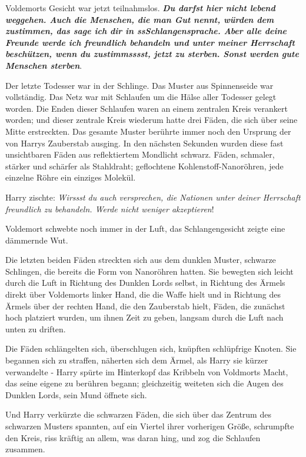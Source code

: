 Voldemorts Gesicht war jetzt teilnahmslos. \glqq{}\textbf{\emph{Du darfst hier
nicht lebend weggehen. Auch die Menschen, die man Gut nennt, würden dem
zustimmen, das sage ich dir in ssSchlangensprache. Aber alle deine Freunde werde
ich freundlich behandeln und unter meiner Herrschaft beschützen, wenn du
zustimmsssst, jetzt zu sterben. Sonst werden gute Menschen sterben}}.\grqq{}

Der letzte Todesser war in der Schlinge. Das Muster aus Spinnenseide war
vollständig. Das Netz war mit Schlaufen um die Hälse aller Todesser gelegt
worden. Die Enden dieser Schlaufen waren an einem zentralen Kreis verankert
worden; und dieser zentrale Kreis wiederum hatte drei Fäden, die sich über seine
Mitte erstreckten. Das gesamte Muster berührte immer noch den Ursprung der von
Harrys Zauberstab ausging. In den nächsten Sekunden wurden diese fast
unsichtbaren Fäden aus reflektiertem Mondlicht schwarz. Fäden, schmaler, stärker
und schärfer als Stahldraht; geflochtene Kohlenstoff-Nanoröhren, jede einzelne
Röhre ein einziges Molekül.

Harry zischte: \glqq{}\emph{Wirssst du auch versprechen, die Nationen unter
deiner Herrschaft freundlich zu behandeln. Werde nicht weniger
akzeptieren}!\grqq{}

Voldemort schwebte noch immer in der Luft, das Schlangengesicht zeigte eine
dämmernde Wut.

Die letzten beiden Fäden streckten sich aus dem dunklen Muster, schwarze
Schlingen, die bereits die Form von Nanoröhren hatten. Sie bewegten sich leicht
durch die Luft in Richtung des Dunklen Lords selbst, in Richtung des Ärmels
direkt über Voldemorts linker Hand, die die Waffe hielt und in Richtung des
Ärmels über der rechten Hand, die den Zauberstab hielt, Fäden, die zunächst hoch
platziert wurden, um ihnen Zeit zu geben, langsam durch die Luft nach unten zu
driften.

Die Fäden schlängelten sich, überschlugen sich, knüpften schlüpfrige Knoten. Sie
begannen sich zu straffen, näherten sich dem Ärmel, als Harry sie kürzer
verwandelte - Harry spürte im Hinterkopf das Kribbeln von Voldmorts Macht, das
seine eigene zu berühren begann; gleichzeitig weiteten sich die Augen des
Dunklen Lords, sein Mund öffnete sich.

Und Harry verkürzte die schwarzen Fäden, die sich über das Zentrum des schwarzen
Musters spannten, auf ein Viertel ihrer vorherigen Größe, schrumpfte den Kreis,
riss kräftig an allem, was daran hing, und zog die Schlaufen zusammen.

